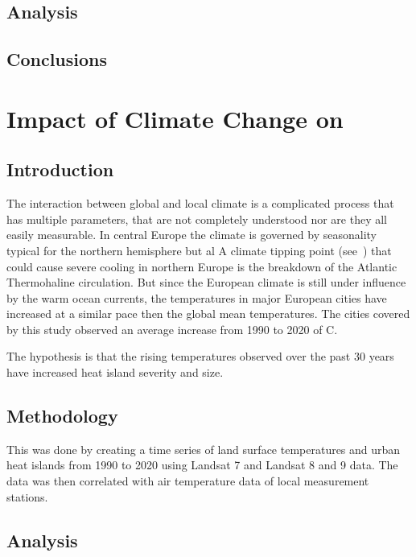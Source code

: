 \documentclass[a4paper, english]{article}
\begin{document}
    \subsection{Analysis}
    \subsection{Conclusions}


  \section{Impact of Climate Change on \texorpdfstring{}{Urban Heat Islands}}\label{sec:UHITempImp}
    \subsection{Introduction}
    The interaction between global and local climate is a complicated process that has multiple parameters, that are not completely understood nor are they all easily measurable. 
    In central Europe the climate is governed by seasonality typical for the northern hemisphere but al
    A climate tipping point (see~\cite{Lenton2008}) that could cause severe cooling in northern Europe is the breakdown of the Atlantic Thermohaline circulation\cite{Rahmstorf1999}.
    But since the European climate is still under influence by the warm ocean currents, the temperatures in major European cities have increased at a similar pace then the global mean temperatures. 
    The cities covered by this study observed an average increase from 1990 to 2020 of %
    \textdegree C. 



%
    The hypothesis is that the rising temperatures observed over the past 30 years have increased heat island severity and size. 
    \subsection{Methodology}
    This was done by creating a time series of land surface temperatures and urban heat islands from 1990 to 2020 using Landsat 7 and Landsat 8 and 9 data. 
    The data was then correlated with air temperature data of local measurement stations. 


    \subsection{Analysis}
\end{document}

